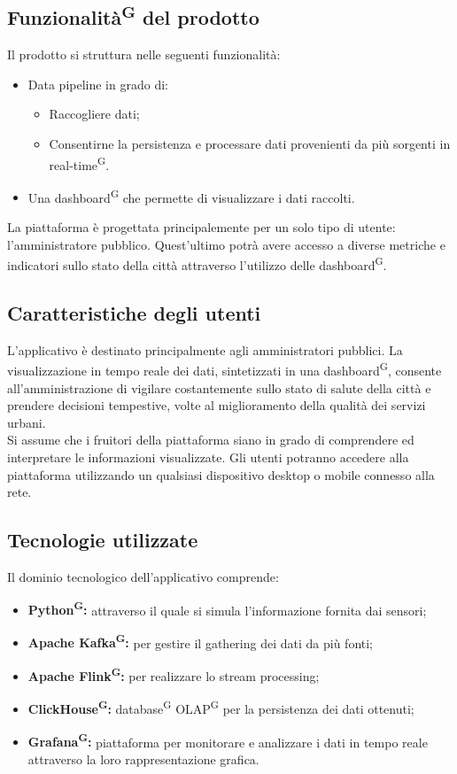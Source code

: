 \documentclass[8pt]{article}
\newcommand{\glossterm}[1]{#1\textsuperscript{G}} %
\begin{document}
\subsection{\glossterm{Funzionalità} del prodotto}
Il prodotto si struttura nelle seguenti funzionalità:
\begin{itemize}
	\setlength\itemsep{0em}
  \item Data pipeline in grado di:
  \begin{itemize}  
  \item Raccogliere dati; 
	\item Consentirne la persistenza e processare dati provenienti da più sorgenti in \glossterm{real-time}.
  \end{itemize}  
	\item Una \glossterm{dashboard} che permette di visualizzare i dati raccolti.
\end{itemize}
La piattaforma è progettata principalemente per un solo tipo di utente: l'amministratore pubblico. Quest'ultimo potrà avere accesso a diverse metriche e indicatori sullo stato della città attraverso l'utilizzo delle \glossterm{dashboard}.
\subsection{Caratteristiche degli utenti} \label{sec:users}
L'applicativo è destinato principalmente agli amministratori pubblici. La visualizzazione in tempo reale dei dati, sintetizzati in una \glossterm{dashboard}, consente all'amministrazione di vigilare costantemente sullo stato di salute della città e prendere decisioni tempestive, volte al miglioramento della qualità dei servizi urbani. \\ Si assume che i fruitori della piattaforma siano in grado di comprendere ed interpretare le informazioni visualizzate. Gli utenti potranno accedere alla piattaforma utilizzando un qualsiasi dispositivo desktop o mobile connesso alla rete.
\subsection{Tecnologie utilizzate}
Il dominio tecnologico dell'applicativo comprende:
\begin{itemize}
	\setlength\itemsep{0em}
  \item \textbf{\glossterm{Python}: }attraverso il quale si simula l'informazione fornita dai sensori;
  \item \textbf{\glossterm{Apache Kafka}:} per gestire il gathering dei dati da più fonti;
  \item \textbf{\glossterm{Apache Flink}:} per realizzare lo stream processing;
  \item \textbf{\glossterm{ClickHouse}:} \glossterm{database} \glossterm{OLAP} per la persistenza dei dati ottenuti;
  \item \textbf{\glossterm{Grafana}:} piattaforma per monitorare e analizzare i dati in tempo reale attraverso la loro rappresentazione grafica.
\end{itemize}
\end{document}
